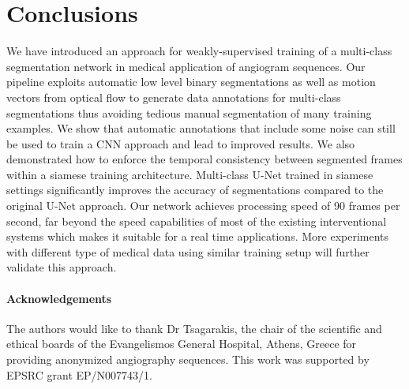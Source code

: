 \documentclass{bmvc2k}
\begin{document}
\section{Conclusions}
We have introduced an approach for weakly-supervised training of a multi-class segmentation network in medical application of angiogram sequences. Our pipeline exploits automatic low level binary segmentations as well as motion vectors from optical flow to generate data annotations for multi-class segmentations thus avoiding tedious  manual segmentation of many training examples. We show that automatic annotations that include some noise can still be used to train a CNN approach and lead to improved results. We also demonstrated how to enforce the temporal consistency between segmented frames within a siamese training architecture. Multi-class U-Net trained in siamese settings   significantly improves the accuracy of segmentations compared to the original U-Net approach. Our network achieves processing speed of 90 frames per second, far beyond the speed capabilities of most of the existing interventional systems which makes it suitable for a real time applications. More experiments with different type of medical data using similar training setup will further validate this approach.
\paragraph{Acknowledgements}
The authors would like to thank Dr Tsagarakis, the chair of the scientific and ethical boards of the Evangelismos General Hospital, Athens, Greece for providing anonymized angiography sequences. 
This work was supported by EPSRC grant EP/N007743/1.%


\end{document}
